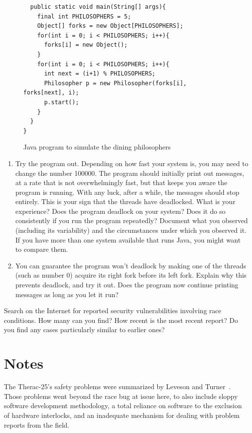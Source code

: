 \begin{chapterEnumerate}
\begin{figure}
\begin{verbatim}
  public static void main(String[] args){
    final int PHILOSOPHERS = 5;
    Object[] forks = new Object[PHILOSOPHERS];
    for(int i = 0; i < PHILOSOPHERS; i++){
      forks[i] = new Object();
    }
    for(int i = 0; i < PHILOSOPHERS; i++){
      int next = (i+1) % PHILOSOPHERS;
      Philosopher p = new Philosopher(forks[i], forks[next], i);
      p.start();
    }
  }
}
\end{verbatim}
\caption{Java program to simulate the dining
  philosophers}\label{dining-philosophers-code}
\end{figure}
\begin{enumerate}
\item
Try the program out.  Depending on how fast your system is, you may
need to change the number 100000.  The program should initially print out
messages, at a rate that is not overwhelmingly fast, but
that keeps you aware the program is running.  With any luck, after a
while, the messages should stop entirely.  This is your sign that the
threads have deadlocked.  What is your experience?  Does the program
deadlock on your system?  Does it do so consistently if you run the
program repeatedly?  Document what you observed (including its
variability) and the circumstances under which you observed it.  If
you have more than one system available that runs Java, you might want
to compare them.
\item
You can guarantee the program won't deadlock by making one of the
threads (such as number 0) acquire its right fork before its left fork.
Explain why this prevents deadlock, and try it out.
Does the program now continue printing messages as long as you let it
run?
\end{enumerate}
\item
Search on the Internet for reported security vulnerabilities involving
race conditions.  How many can you find?  How recent is the most
recent report?  Do you find any cases particularly similar to earlier ones?
\end{chapterEnumerate}

\section*{Notes}
The Therac-25's safety problems were summarized by
Leveson and
Turner~\cite{max800}.  Those problems went beyond the race bug at
issue here, to also include sloppy software development methodology, a
total reliance on software to the exclusion of hardware interlocks,
and an inadequate mechanism for dealing with problem reports from the
field.

